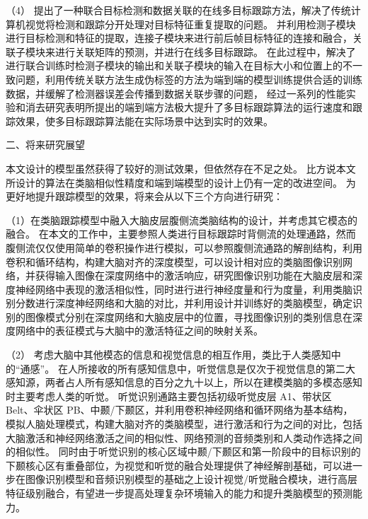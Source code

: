 （4）  
提出了一种联合目标检测和数据关联的在线多目标跟踪方法，解决了传统计算机视觉将检测和跟踪分开处理对目标特征重复提取的问题。
并利用检测子模块进行目标检测和特征的提取，连接子模块来进行前后帧目标特征的连接和融合，关联子模块来进行关联矩阵的预测，并进行在线多目标跟踪。
在此过程中，解决了进行联合训练时检测子模块的输出和关联子模块的输入在目标大小和位置上的不一致问题，利用传统关联方法生成伪标签的方法为端到端的模型训练提供合适的训练数据，并缓解了检测器误差会传播到数据关联步骤的问题，
经过一系列的性能实验和消去研究表明所提出的端到端方法极大提升了多目标跟踪算法的运行速度和跟踪效果，使多目标跟踪算法能在实际场景中达到实时的效果。

二、将来研究展望

本文设计的模型虽然获得了较好的测试效果，但依然存在不足之处。
比方说本文所设计的算法在类脑相似性精度和端到端模型的设计上仍有一定的改进空间。
为更好地提升跟踪模型的效果，将来会从以下三个方向进行研究：


（1）在类脑跟踪模型中融入大脑皮层腹侧流类脑结构的设计，并考虑其它模态的融合。
在本文的工作中，主要参照人类进行目标跟踪时背侧流的处理通路，然而腹侧流仅仅使用简单的卷积操作进行模拟，可以参照腹侧流通路的解剖结构，利用卷积和循环结构，构建大脑对齐的深度模型，可以设计相对应的类脑图像识别网络，并获得输入图像在深度网络中的激活响应，研究图像识别功能在大脑皮层和深度神经网络中表现的激活相似性，同时进行进行神经度量和行为度量，利用类脑识别分数进行深度神经网络和大脑的对比，并利用设计并训练好的类脑模型，确定识别的图像模式分别在深度网络和大脑皮层中的位置，寻找图像识别的类别信息在深度网络中的表征模式与大脑中的激活特征之间的映射关系。

（2）
考虑大脑中其他模态的信息和视觉信息的相互作用，类比于人类感知中的“通感”。
在人所接收的所有感知信息中，听觉信息是仅次于视觉信息的第二大感知源，两者占人所有感知信息的百分之九十以上，所以在建模类脑的多模态感知时主要考虑人类的听觉。
听觉识别通路主要包括初级听觉皮层 A1、带状区 Belt、伞状区 PB、中颞/下颞区，并利用卷积神经网络和循环网络为基本结构，模拟人脑处理模式，构建大脑对齐的类脑模型，进行激活和行为之间的对比，包括大脑激活和神经网络激活之间的相似性、网络预测的音频类别和人类动作选择之间的相似性。
同时由于听觉识别的核心区域中颞/下颞区和第一阶段中的目标识别的下颞核心区有重叠部位，为视觉和听觉的融合处理提供了神经解剖基础，可以进一步在图像识别模型和音频识别模型的基础之上设计视觉/听觉融合模块，进行高层特征级别融合，有望进一步提高处理复杂环境输入的能力和提升类脑模型的预测能力。

